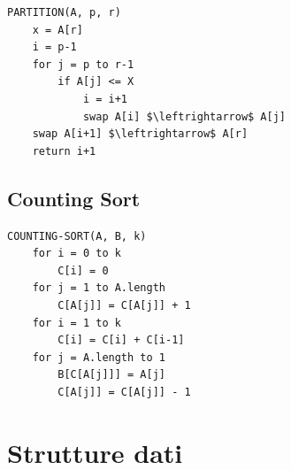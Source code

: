 \documentclass[10pt,a4paper]{article}
\begin{document}
\begin{multicols*}{2}
\begin{lstlisting}
PARTITION(A, p, r)
    x = A[r]
    i = p-1
    for j = p to r-1
        if A[j] <= X
            i = i+1
            swap A[i] $\leftrightarrow$ A[j]
    swap A[i+1] $\leftrightarrow$ A[r]
    return i+1
\end{lstlisting}
\subsection*{Counting Sort}
\begin{lstlisting}
COUNTING-SORT(A, B, k)
    for i = 0 to k
        C[i] = 0
    for j = 1 to A.length
        C[A[j]] = C[A[j]] + 1
    for i = 1 to k
        C[i] = C[i] + C[i-1]
    for j = A.length to 1
        B[C[A[j]]] = A[j]
        C[A[j]] = C[A[j]] - 1
\end{lstlisting}
\end{multicols*}

\pagebreak

\section*{Strutture dati}
\end{document}
